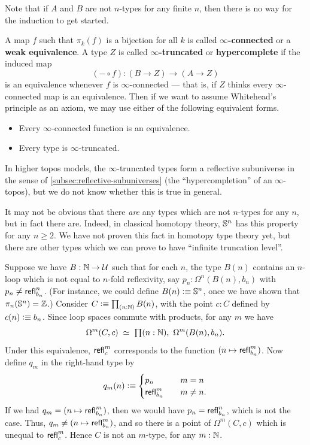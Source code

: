 Note that if $A$ and $B$ are not $n$-types for any finite $n$, then there is no way for the induction to get started.

A map $f$ such that $\pi_k(f)$ is a bijection for all $k$ is called \textbf{$\infty$-connected} or a \textbf{weak equivalence}.
A type $Z$ is called \textbf{$\infty$-truncated} or \textbf{hypercomplete} if the induced map
\[(-\circ f):(B\to Z) \to (A\to Z)\]
is an equivalence whenever $f$ is $\infty$-connected --- that is, if $Z$ thinks every $\infty$-connected map is an equivalence.
Then if we want to assume Whitehead's principle as an axiom, we may use either of the following equivalent forms.
\begin{itemize}
\item Every $\infty$-connected function is an equivalence.
\item Every type is $\infty$-truncated.
\end{itemize}
In higher topos models, the $\infty$-truncated types form a reflective subuniverse in the sense of \autoref{subsec:reflective-subuniverses} (the ``hypercompletion'' of an $\infty$-topos), but we do not know whether this is true in general.

It may not be obvious that there \emph{are} any types which are not $n$-types for any $n$, but in fact there are.
Indeed, in classical homotopy theory, $\mathbb{S}^n$ has this property for any $n\ge 2$.
We have not proven this fact in homotopy type theory yet, but there are other types which we can prove to have ``infinite truncation level''.

\begin{eg}
  Suppose we have $B:\mathbb{N}\to\mathcal{U}$ such that for each $n$, the type $B(n)$ contains an $n$-loop which is not equal to $n$-fold reflexivity, say $p_n:\Omega^n(B(n),b_n)$ with $p_n \neq \mathsf{refl}_{b_n}^n$.
  (For instance, we could define $B(n)\vcentcolon\equiv \mathbb{S}^n$, once we have shown that $\pi_n(\mathbb{S}^n)=\mathbb{Z}$.)
  Consider $C\defeq \prd{n:\nat} B(n)$, with the point $c:C$ defined by $c(n)\vcentcolon\equiv b_n$.
  Since loop spaces commute with products, for any $m$ we have
  \[\eqvspaced{\Omega^m (C,c)}{\prd{n:\nat}\Omega^m(B(n),b_n)}.\]
  Under this equivalence, $\mathsf{refl}_{c}^m$ corresponds to the function $(n\mapsto \mathsf{refl}_{b_n}^m)$.
  Now define $q_m$ in the right-hand type by
  \[ q_m(n) \vcentcolon\equiv
  \begin{cases}
    p_n &\quad m=n\\
    \mathsf{refl}_{b_n}^m &\quad m\neq n.
  \end{cases}
  \]
  If we had $q_m = (n\mapsto \mathsf{refl}_{b_n}^m)$, then we would have $p_n = \mathsf{refl}_{b_n}^n$, which is not the case.
  Thus, $q_m \neq (n\mapsto \mathsf{refl}_{b_n}^m)$, and so there is a point of $\Omega^m(C,c)$ which is unequal to $\mathsf{refl}_{c}^m$.
  Hence $C$ is not an $m$-type, for any $m:\mathbb{N}$.
\end{eg}

